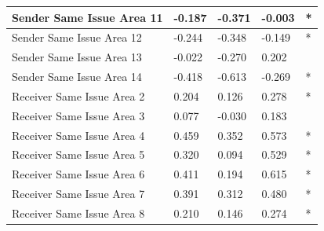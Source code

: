 \documentclass[headsepline=true, abstracton]{scrartcl}
\begin{document}
\begin{table}[H]
\begin{tabular}{|
>{\columncolor[HTML]{EFEFEF}}l |l|l|l|l|}
Sender Same Issue Area 11              & -0.187                           & -0.371                              & -0.003                              & *                                    \\ \hline
Sender Same Issue Area 12              & -0.244                           & -0.348                              & -0.149                              & *                                    \\ \hline
Sender Same Issue Area 13              & -0.022                           & -0.270                              & 0.202                               &                                      \\ \hline
Sender Same Issue Area 14              & -0.418                           & -0.613                              & -0.269                              & *                                    \\ \hline
Receiver Same Issue Area 2             & 0.204                            & 0.126                               & 0.278                               & *                                    \\ \hline
Receiver Same Issue Area 3             & 0.077                            & -0.030                              & 0.183                               &                                      \\ \hline
Receiver Same Issue Area 4             & 0.459                            & 0.352                               & 0.573                               & *                                    \\ \hline
Receiver Same Issue Area 5             & 0.320                            & 0.094                               & 0.529                               & *                                    \\ \hline
Receiver Same Issue Area 6             & 0.411                            & 0.194                               & 0.615                               & *                                    \\ \hline
Receiver Same Issue Area 7             & 0.391                            & 0.312                               & 0.480                               & *                                    \\ \hline
Receiver Same Issue Area 8             & 0.210                            & 0.146                               & 0.274                               & *                                    \\ \hline

\end{tabular}
\end{table}
\end{document}
